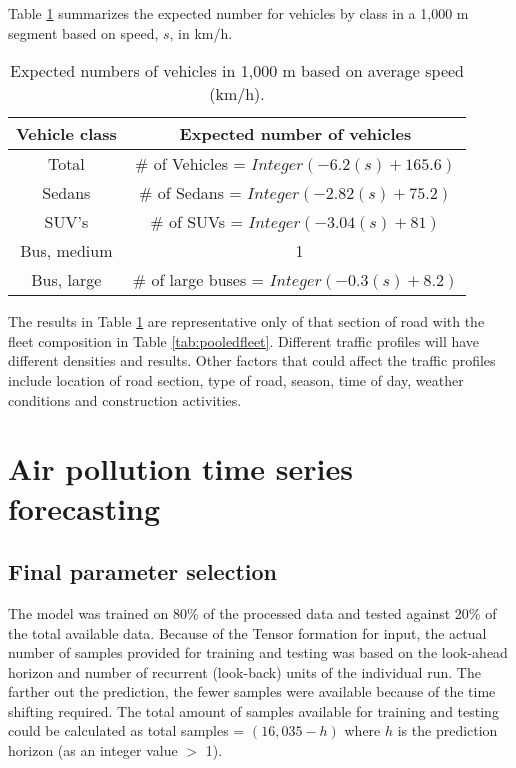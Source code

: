 Table \ref{tb4:expectedvehicles} summarizes the expected number for vehicles by class in a 1,000 m segment based on speed, $s$, in km/h.
%
\begin{table}[H]
\centering
\caption{ Expected numbers of vehicles in 1,000 m based on average speed (km/h).}
\label{tb4:expectedvehicles}
\begin{tabular}{@{}cc@{}}
\toprule
\textbf{Vehicle class} & \textbf{Expected number of vehicles } \\ \midrule
Total & \# of Vehicles = $Integer(-6.2(s) + 165.6)$ \\
Sedans & \# of Sedans = $Integer (-2.82(s) + 75.2)$ \\
SUV's & \# of SUVs = $Integer (-3.04(s) + 81)$ \\
Bus, medium & \ 1 \\
Bus, large & \# of large buses = $Integer (-0.3(s) + 8.2)$ \\ \bottomrule
\end{tabular}
\end{table}
%
The results in Table \ref{tb4:expectedvehicles} are representative only of that section of road with the fleet composition in Table \ref{tab:pooledfleet}.  Different traffic profiles will have different densities and results.  Other factors that could affect the traffic profiles include location of road section, type of road, season, time of day, weather conditions and construction activities. 

\clearpage
\section{Air pollution time series forecasting}

\subsection{Final parameter selection}
The model was trained on 80\% of the processed data and tested against 20\% of the total available data. Because of the Tensor formation for input, the actual number of samples provided for training and testing was based on the look-ahead horizon and number of recurrent (look-back) units of the individual run. The farther out the prediction, the fewer samples were available because of the time shifting required. The total amount of samples available for training and testing could be calculated as total samples = $(16,035 - h)$ where $h$ is the prediction horizon (as an integer value $>$ 1). 

